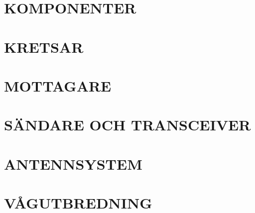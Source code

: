 \documentclass[a4paper,twoside,twocolumn,openright]{book}
\begin{document}
\chapter{KOMPONENTER}

\cleardoublepage

\cleardoublepage

\cleardoublepage

\cleardoublepage

\cleardoublepage

\cleardoublepage

\cleardoublepage

\cleardoublepage


\chapter{KRETSAR}

\cleardoublepage

\cleardoublepage

\cleardoublepage

\cleardoublepage

\cleardoublepage

\cleardoublepage

\cleardoublepage

\cleardoublepage


\chapter{MOTTAGARE}

\cleardoublepage

\cleardoublepage

\cleardoublepage

\cleardoublepage

\cleardoublepage

\cleardoublepage

\cleardoublepage

\cleardoublepage


\chapter{SÄNDARE OCH TRANSCEIVER}

\cleardoublepage


\chapter{ANTENNSYSTEM}

\cleardoublepage

\cleardoublepage

\cleardoublepage

\cleardoublepage

\cleardoublepage


\chapter{VÅGUTBREDNING}

\cleardoublepage

\cleardoublepage

\cleardoublepage

\cleardoublepage

\end{document}
